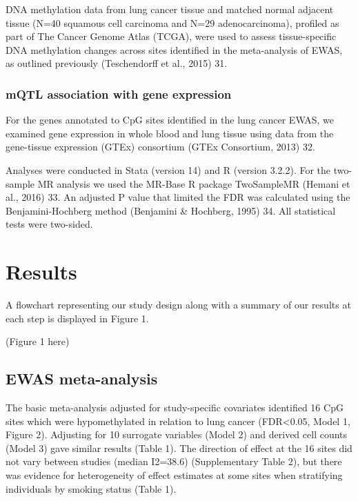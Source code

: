 \documentclass[11pt,twoside]{bristolthesis}
\begin{document}
DNA methylation data from lung cancer tissue and matched normal adjacent tissue (N=40 squamous cell carcinoma and N=29 adenocarcinoma), profiled as part of The Cancer Genome Atlas (TCGA), were used to assess tissue-specific DNA methylation changes across sites identified in the meta-analysis of EWAS, as outlined previously (Teschendorff et al., 2015) 31.

\hypertarget{mqtl-association-with-gene-expression}{%
\subsubsection{mQTL association with gene expression}\label{mqtl-association-with-gene-expression}}

For the genes annotated to CpG sites identified in the lung cancer EWAS, we examined gene expression in whole blood and lung tissue using data from the gene-tissue expression (GTEx) consortium (GTEx Consortium, 2013) 32.

Analyses were conducted in Stata (version 14) and R (version 3.2.2). For the two-sample MR analysis we used the MR-Base R package TwoSampleMR (Hemani et al., 2016) 33. An adjusted P value that limited the FDR was calculated using the Benjamini-Hochberg method (Benjamini \& Hochberg, 1995) 34. All statistical tests were two-sided.

\hypertarget{results-2}{%
\section{Results}\label{results-2}}

A flowchart representing our study design along with a summary of our results at each step is displayed in Figure 1.

(Figure 1 here)

\hypertarget{ewas-meta-analysis-1}{%
\subsection{EWAS meta-analysis}\label{ewas-meta-analysis-1}}

The basic meta-analysis adjusted for study-specific covariates identified 16 CpG sites which were hypomethylated in relation to lung cancer (FDR\textless0.05, Model 1, Figure 2). Adjusting for 10 surrogate variables (Model 2) and derived cell counts (Model 3) gave similar results (Table 1). The direction of effect at the 16 sites did not vary between studies (median I2=38.6) (Supplementary Table 2), but there was evidence for heterogeneity of effect estimates at some sites when stratifying individuals by smoking status (Table 1).
\end{document}
